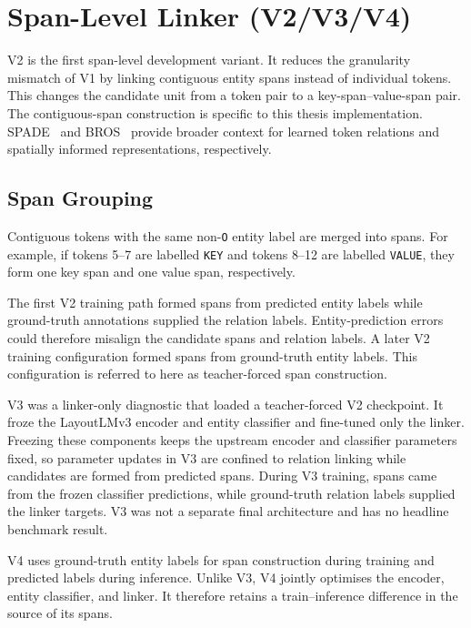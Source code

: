 \section{Span-Level Linker (V2/V3/V4)}
\label{sec:v2-span-linking}

V2 is the first span-level development variant. It reduces the granularity
mismatch of V1 by linking contiguous entity spans instead of individual
tokens. This changes the candidate unit from a token pair to a
key-span--value-span pair. The contiguous-span construction is specific to
this thesis implementation. SPADE~\cite{spade} and BROS~\cite{bros} provide
broader context for learned token relations and spatially informed
representations, respectively.

\subsection{Span Grouping}
\label{sec:span-grouping}

Contiguous tokens with the same non-\texttt{O} entity label are merged into
spans. For example, if tokens 5--7 are labelled
\texttt{KEY} and tokens 8--12 are labelled \texttt{VALUE}, they form one key
span and one value span, respectively.

The first V2 training path formed spans from predicted entity labels while
ground-truth annotations supplied the relation labels. Entity-prediction
errors could therefore misalign the candidate spans and relation labels. A
later V2 training configuration formed spans from ground-truth entity labels.
This configuration is referred to here as teacher-forced span construction.

V3 was a linker-only diagnostic that loaded a teacher-forced V2 checkpoint.
It froze the LayoutLMv3 encoder and entity classifier and fine-tuned only the
linker. Freezing these components keeps the upstream encoder and classifier
parameters fixed, so parameter updates in V3 are confined to relation linking
while candidates are formed from predicted spans. During V3 training, spans
came from the frozen classifier predictions, while ground-truth relation labels
supplied the linker targets. V3 was not a separate final architecture and has
no headline benchmark result.

V4 uses ground-truth entity labels for span construction during training and
predicted labels during inference. Unlike V3, V4 jointly optimises the encoder,
entity classifier, and linker. It therefore retains a train--inference
difference in the source of its spans.

